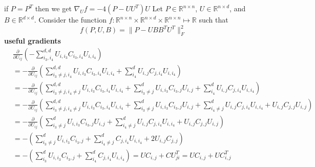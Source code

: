 \documentclass{report}
\begin{document}
   	if $ P = P^T$ then we get 
   	$ \nabla_U f  = -4(P-UU^T)U$
   	\newpage
   	Let $ P \in \mathbb{R}^{n \times n} $, $ U \in \mathbb{R}^{n \times d} $, and $B \in \mathbb{R}^{d \times d} $. Consider the function $ f: \mathbb{R}^{n \times n} \times \mathbb{R}^{n \times d} \times \mathbb{R}^{n \times n} \mapsto \mathbb{R} $ such that 
   	\[ 
   	  f(P,U,B) = \|P - UBB^TU^T\|_F^2
   	\]
   	\textbf{useful gradients}
   	\begin{align*}
   	&\frac{\partial}{\partial U_{ij}} 
   	(- \sum_{i_3,i_4}^{d,d}U_{i,i_3}C_{i_3,i_4}U_{i,i_4}) \\
   	&=  -\frac{\partial}{\partial U_{ij}} 
   	(\sum_{i_3 \neq j,i_4}^{d,d}U_{i,i_3}C_{i_3,i_4}U_{i,i_4} 
   	+ \sum_{i_4}^{d}U_{i,j}C_{j,i_4}U_{i,i_4}) \\
   	&= -\frac{\partial}{\partial U_{ij}} (\sum_{i_3 \neq j,i_4 \neq j}^{d,d}U_{i,i_3}C_{i_3,i_4}U_{i,i_4}
   	+ \sum_{i_3 \neq j}^{d}U_{i,i_3}C_{i_3,j}U_{i,j} 
   	+ \sum_{i_4}^{d}U_{i,j}C_{j,i_4}U_{i,i_4})\\
   	&= -\frac{\partial}{\partial U_{ij}} 
   	(\sum_{i_3 \neq j,i_4 \neq j}^{d,d}U_{i,i_3}C_{i_3,i_4}U_{i,i_4} 
   	+ \sum_{i_3 \neq j}^{d}U_{i,i_3}C_{i_3,j}U_{i,j} 
   	+ \sum_{i_4 \neq j}^{d}U_{i,j}C_{j,i_4}U_{i,i_4} 
   	+ U_{i,j}C_{j,j}U_{i,j} )\\
   	&= -\frac{\partial}{\partial U_{ij}} (
   	\sum_{i_3 \neq j}^{d}U_{i,i_3}C_{i_3,j}U_{i,j} 
   	+ \sum_{i_4 \neq j}^{d}U_{i,j}C_{j,i_4}U_{i,i_4} 
   	+ U_{i,j}C_{j,j}U_{i,j} ) \\
   	&= -(
   	\sum_{i_3 \neq j}^{d}U_{i,i_3}C_{i_3,j} 
   	+ \sum_{i_4 \neq j}^{d}C_{j,i_4}U_{i,i_4} 
   	+ 2U_{i,j}C_{j,j})\\
   	&= -(
   	\sum_{i_3}^{d}U_{i,i_3}C_{i_3,j} + \sum_{i_4}^{d}C_{j,i_4}U_{i,i_4})  
   	=UC_{i,j} + CU^T_{ji} = UC_{i,j} + UC^T_{i,j}
   	\end{align*}
 
\end{document}
